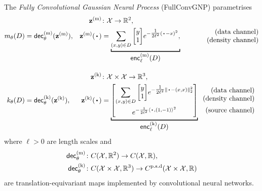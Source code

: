 \documentclass[12pt]{report}
\begin{document}
\begin{model}
    \label{mod:fullconvgnp}
    The \emph{Fully Convolutional Gaussian Neural Process} (FullConvGNP) parametrises
    \begin{align*}
        & & \vz\us{(m)} &\colon \X \to \R^{2}, \\
        m_\theta(D) \!\!&\,\,= \dec\us{(m)}_\theta(\vz\us{(m)}), &
        \vz\us{(m)}(\vardot) &= \underbracket[1pt]{
            \sum_{(x, y) \in D} {\begin{bmatrix}
                y \\ 1
            \end{bmatrix}} e^{-\tfrac1{2\ell^2}(\vardot - x)^2},
            }_{
                \displaystyle\enc\us{(m)}_\ell(D)
            }
            \hspace{37pt}
            \begin{matrix*}[r]
                \text{\normalshape (data channel)} \\
                \text{\normalshape (density channel)}
            \end{matrix*}
            \\[1em]
        & & \vz\us{(k)} &\colon \X \times \X \to \R^{3}, \\
        k_\theta(D) \!\!&\,\,= \dec\us{(k)}_\theta(\vz\us{(k)}), &
        \vz\us{(k)}(\vardot) &= \underbracket[1pt]{
             {\begin{bmatrix}
                \displaystyle\sum_{(x, y) \in D} {\begin{bmatrix}
                    y \\ 1
            \end{bmatrix}} e^{-\tfrac1{2\ell^2}\norm{\vardot - (x, x)}^2_2} \\[1.5em]
                e^{-\frac1{2\ell^2}\lra{\vardot, (1, -1)}^2}
            \end{bmatrix}} 
            }_{
                \displaystyle\enc\us{(k)}_\ell(D)
            }
            \;\;
            \begin{matrix*}[r]
                \text{\normalshape (data channel)} \\
                \text{\normalshape (density channel)} \\[5pt]
                \text{\normalshape (source channel)} \\
            \end{matrix*}
    \end{align*}
    where $\ell > 0$ are length scales and
    \begin{align}
        \dec\us{(m)}_\theta &\colon C(\X, \R^2) \to C(\X, \R), \\
        \dec\us{(k)}_\theta &\colon C(\X \times \X, \R^3) \to C\us{p.s.d}(\X \times \X, \R) \label{eq:fullconvgnp_kernel_decoder}
    \end{align}
    are translation-equivariant maps implemented by convolutional neural networks.
\end{model}
\end{document}
